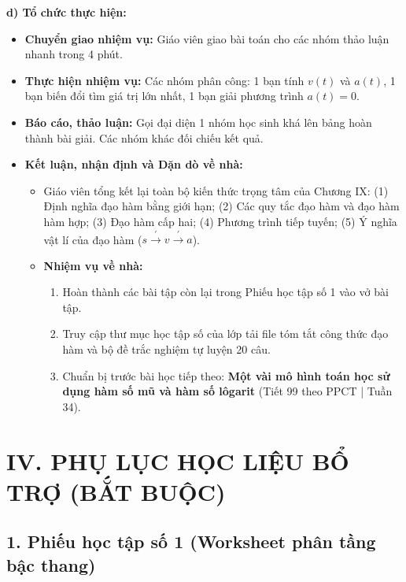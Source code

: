 \documentclass[12pt, a4paper]{article}
\begin{document}
\noindent \textbf{d) Tổ chức thực hiện:}
\begin{itemize}[leftmargin=0.6cm]
    \item \textbf{Chuyển giao nhiệm vụ:} Giáo viên giao bài toán cho các nhóm thảo luận nhanh trong 4 phút.
    \item \textbf{Thực hiện nhiệm vụ:} Các nhóm phân công: 1 bạn tính $v(t)$ và $a(t)$, 1 bạn biến đổi tìm giá trị lớn nhất, 1 bạn giải phương trình $a(t) = 0$.
    \item \textbf{Báo cáo, thảo luận:} Gọi đại diện 1 nhóm học sinh khá lên bảng hoàn thành bài giải. Các nhóm khác đối chiếu kết quả.
    \item \textbf{Kết luận, nhận định và Dặn dò về nhà:}
    \begin{itemize}
        \item Giáo viên tổng kết lại toàn bộ kiến thức trọng tâm của Chương IX: (1) Định nghĩa đạo hàm bằng giới hạn; (2) Các quy tắc đạo hàm và đạo hàm hàm hợp; (3) Đạo hàm cấp hai; (4) Phương trình tiếp tuyến; (5) Ý nghĩa vật lí của đạo hàm ($s \xrightarrow{'} v \xrightarrow{'} a$).
        \item \textbf{Nhiệm vụ về nhà:}
        \begin{enumerate}
            \item Hoàn thành các bài tập còn lại trong Phiếu học tập số 1 vào vở bài tập.
            \item Truy cập thư mục học tập số của lớp tải file tóm tắt công thức đạo hàm và bộ đề trắc nghiệm tự luyện 20 câu.
            \item Chuẩn bị trước bài học tiếp theo: \textbf{Một vài mô hình toán học sử dụng hàm số mũ và hàm số lôgarit} (Tiết 99 theo PPCT | Tuần 34).
        \end{enumerate}
    \end{itemize}
\end{itemize}

\vspace{10pt}

\section*{IV. PHỤ LỤC HỌC LIỆU BỔ TRỢ (BẮT BUỘC)}

\subsection*{1. Phiếu học tập số 1 (Worksheet phân tầng bậc thang)}
\end{document}
